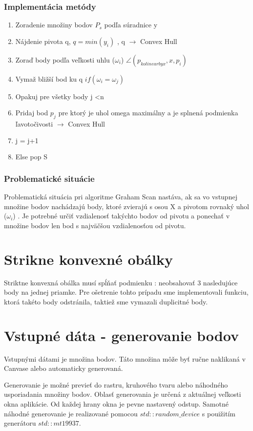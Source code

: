 \documentclass[12pt]{article}
\begin{document}
\subsubsection{Implementácia metódy}
\begin{enumerate}
	\item Zoradenie množiny bodov $P_s$ podľa súradnice y 
	\item Nájdenie pivota q, $ q = min(y_i)$ , q $\to$ Convex Hull
	\item Zoraď body podľa veľkosti uhlu  ($\omega_i$) $ \angle(p_{kolinearbyx}, x, p_i)$
	\item Vymaž bližší bod ku q $ if(\omega_i = \omega_j) $
	\item Opakuj pre všetky body j \textless  n
	\item Pridaj bod $p_j$ pre ktorý je uhol omega maximálny a je splnená podmienka ľavotočivosti  $\to$ Convex Hull
	\item \hspace {1.5cm} j = j+1
	\item Else pop S	
\end{enumerate}
\subsubsection{Problematické situácie}
Problematická situácia pri algoritme Graham Scan nastáva, ak sa vo vstupnej množine bodov nachádzajú body, ktoré zvierajú s osou X a pivotom rovnaký uhol ($\omega_i$) . Je potrebné určiť vzdialenosť takýchto bodov od pivotu a ponechať v množine bodov len bod s najväčšou vzdialenosťou od pivotu.



\clearpage 
\section{Strikne konvexné obálky}
Striktne konvexná obálka musí spĺňať podmienku : neobsahovať 3 nasledujúce body na jednej priamke. Pre ošetrenie tohto prípadu sme implementovali funkciu, ktorá takéto body odstránila, taktiež sme vymazali duplicitné body. 

\section{Vstupné dáta - generovanie bodov}
Vstupnými dátami je množina bodov. Táto množina môže byť ručne naklikaná v Canvase alebo automaticky generovaná.

Generovanie je možné previeť do rastru, kruhového tvaru alebo náhodného usporiadania množiny bodov. Oblasť generovania je určená z aktuálnej veľkosti okna aplikácie. Od každej hrany okna je pevne nastavený odstup. Samotné náhodné generovanie je realizované pomocou $std:: random\_device$ s pouižitím generátoru $std::mt19937$.
\end{document}
